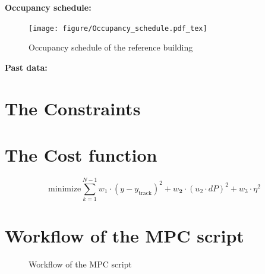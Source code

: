 \textbf{Occupancy schedule:}\newline
    \begin{figure}[h]
            \centering
            \texttt{[image: figure/Occupancy\_schedule.pdf\_tex]}
           \caption{Occupancy schedule of the reference building}
           \label{fig:OccupancySchedule}
    \end{figure}

\textbf{Past data:}\newline

\section{The Constraints}
\label{section:theconstraints}
\section{The Cost function}
\label{section:thecostfunction}
\begin{equation}
    \text{minimize} \sum_{k=1}^{N-1} w_\text{1}\cdot (y-y_\text{track})^2 + w_\textbf{2}\cdot(u_\text{2}\cdot dP)^2 + w_\text{3} \cdot \eta^2
\end{equation}
\section{Workflow of the MPC script}
\label{section:workflowMPC}
\begin{figure}[h]
            \centering
            \def\svgwidth{0.6\textwidth}
            
            \caption{Workflow of the MPC script}
            \label{fig:workflowMPC}
    \end{figure}